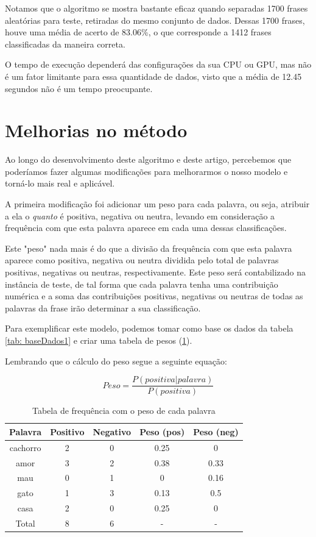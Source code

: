 \documentclass[
article,			%
12pt,				%
a4paper,			%
english,			%
brazil,				%
sumario=tradicional,
twoside
]{abntex2}
\begin{document}
		Notamos que o algoritmo se mostra bastante eficaz quando separadas 1700 frases aleatórias para teste, retiradas do mesmo conjunto de dados. Dessas 1700 frases, houve uma média de acerto de 83.06\%, o que corresponde a 1412 frases classificadas da maneira correta.
		
		O tempo de execução dependerá das configurações da sua CPU ou GPU, mas não é um fator limitante para essa quantidade de dados, visto que a média de 12.45 segundos não é um tempo preocupante.
		
		
	\section{Melhorias no método}
	\label{melhorias}
	Ao longo do desenvolvimento deste algoritmo e deste artigo, percebemos que poderíamos fazer algumas modificações para melhorarmos o nosso modelo e torná-lo mais real e aplicável.
	
	A primeira modificação foi adicionar um peso para cada palavra, ou seja, atribuir a ela o \emph{quanto} é positiva, negativa ou neutra, levando em consideração a frequência com que esta palavra aparece em cada uma dessas classificações. 
	
	Este "peso" nada mais é do que a divisão da frequência com que esta palavra aparece como positiva, negativa ou neutra dividida pelo total de palavras positivas, negativas ou neutras, respectivamente. Este peso será contabilizado na instância de teste, de tal forma que cada palavra tenha uma contribuição numérica e a soma das contribuições positivas, negativas ou neutras de todas as palavras da frase irão determinar a sua classificação.
	
	Para exemplificar este modelo, podemos tomar como base os dados da tabela \ref{tab: baseDados1} e criar uma tabela de pesos (\ref{tab: tabfreq2}).
	
	Lembrando que o cálculo do peso segue a seguinte equação:
	
	\begin{equation}
		Peso = \frac{P(positiva|palavra)}{P(positiva)}
	\end{equation}
	
	\begin{table}[h]
		\caption{Tabela de frequência com o peso de cada palavra}
		\label{tab: tabfreq2}
		\centering
		
		\begin{tabular}{|c|c|c|c|c|} \hline
			\textbf{Palavra} & \textbf{Positivo} & \textbf{Negativo} & \textbf{Peso (pos)} & \textbf{Peso (neg)}\\
			\hline
			cachorro & 2 & 0 & 0.25 & 0\\
			amor & 3 & 2 & 0.38 & 0.33\\
			mau & 0 & 1 & 0 & 0.16\\
			gato & 1 & 3 & 0.13 & 0.5\\
			casa & 2 & 0 & 0.25 & 0\\
			\hline
			Total & 8 & 6  & - & - \\
			\hline
			
		\end{tabular}
		
	\end{table}
\end{document}
